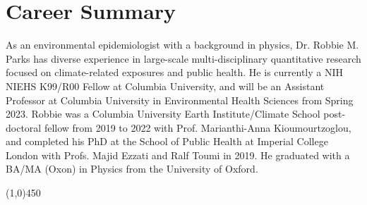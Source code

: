 \section*{Career Summary}

As an environmental epidemiologist with a background in physics, Dr. Robbie M. Parks has diverse experience in large-scale multi-disciplinary quantitative research focused on climate-related exposures and public health. He is currently a NIH NIEHS K99/R00 Fellow at Columbia University, and will be an Assistant Professor at Columbia University in Environmental Health Sciences from Spring 2023. Robbie was a Columbia University Earth Institute/Climate School post-doctoral fellow from 2019 to 2022 with Prof. Marianthi-Anna Kioumourtzoglou, and completed his PhD at the School of Public Health at Imperial College London with Profs. Majid Ezzati and Ralf Toumi in 2019. He graduated with a BA/MA (Oxon) in Physics from the University of Oxford. 

\begin{center} \line(1,0){450} \end{center}